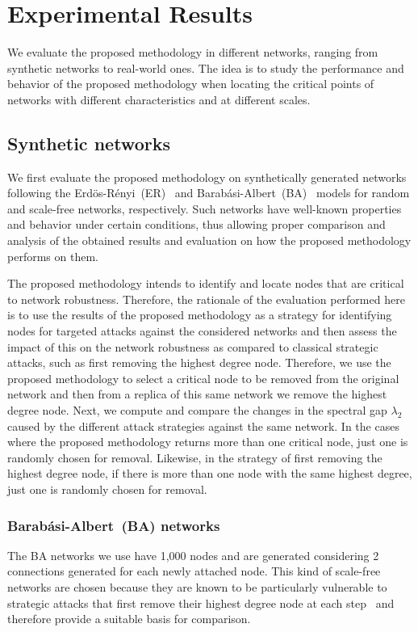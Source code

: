 \documentclass[conference,fleqn]{IEEEtran}
\begin{document}
\section{Experimental Results}
\label{sec:Res}

We evaluate the proposed methodology in different networks, ranging from synthetic networks to real-world ones. The idea is to study
the performance and behavior of the proposed methodology when locating the critical points of networks with different characteristics
and at different scales.

\subsection{Synthetic networks}
\label{subsec:synt-nets}

We first evaluate the proposed methodology on synthetically generated networks following the
Erd\"{o}s-R\'{e}nyi~(ER)~\cite{Erdos1959} and Barab\'{a}si-Albert~(BA)~\cite{Barabasi1999} models
for random and scale-free networks, respectively. Such networks have well-known
properties and behavior under certain conditions, thus allowing proper comparison and
analysis of the obtained results and evaluation on how the proposed methodology performs on them.

The proposed methodology intends to identify and locate nodes that are critical to network robustness.
Therefore, the rationale of the evaluation performed here is to use the
results of the proposed methodology as a strategy for identifying nodes for targeted attacks against
the considered networks and then assess the impact of this on the network robustness as compared
to classical strategic attacks, such as first removing the highest degree node. Therefore,
we use the proposed methodology to select a critical node to be removed from the original network
and then from a replica of this same network we remove the highest degree node. Next, we 
compute and compare the changes in the spectral gap $\lambda_2$ caused by the different attack strategies against the same network. In the cases where the
proposed methodology returns more than one critical node, just one is randomly chosen for removal.
Likewise, in the strategy of first removing the highest degree node, if there is more than one
node with the same highest degree, just one is randomly chosen for removal.

\subsubsection{Barab\'{a}si-Albert~(BA) networks}
The BA networks we use have 1,000 nodes and are generated considering 2 connections generated for each newly attached node.
This kind of scale-free networks are chosen because they are known to be particularly vulnerable to strategic attacks that
first remove their highest degree node at each step~\cite{Albert2000a} and therefore provide a suitable basis for comparison.
\end{document}
